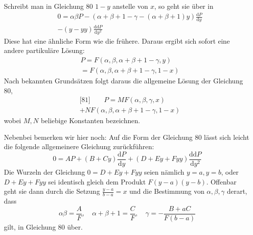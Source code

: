 Schreibt man in Gleichung 80 \(1-y\) anstelle von \(x\), so geht sie über in
\[
\begin{aligned}&0=\alpha\beta P-(\alpha+\beta+1-\gamma-(\alpha+\beta+1)y)
\frac{\mathrm{d}P}{\mathrm{d}y}\\&-(y-yy)\frac{\mathrm{dd}P}{\mathrm{d}y^2}\end{aligned}
\]
Diese hat eine ähnliche Form wie die frühere. Daraus ergibt sich sofort eine andere partikuläre Lösung:
\[
\begin{aligned}&P=F(\alpha,\beta,\alpha+\beta+1-\gamma,y)\\&=F(\alpha,\beta,\alpha+\beta+1-\gamma,1-x)\end{aligned}
\]
Nach bekannten Grundsätzen folgt daraus die allgemeine Lösung der Gleichung 80,
\[
\begin{aligned}&\text{[81]}\qquad
P=MF(\alpha,\beta,\gamma,x)\\&+NF(\alpha,\beta,\alpha+\beta+1-\gamma,1-x)\end{aligned}
\]
wobei \(M,N\) beliebige Konstanten bezeichnen.

Nebenbei bemerken wir hier noch: Auf die Form der Gleichung 80 lässt sich leicht die folgende allgemeinere Gleichung zurückführen:
\[
0=AP+(B+Cy)\frac{\mathrm{d}P}{\mathrm{d}y}
+(D+Ey+Fyy)\frac{\mathrm{dd}P}{\mathrm{d}y^2}
\]
Die Wurzeln der Gleichung \(0=D+Ey+Fyy\) seien nämlich \(y=a,y=b\), oder \(D+Ey+Fyy\) sei identisch gleich dem Produkt \(F(y-a)(y-b)\). Offenbar geht sie dann durch die Setzung \(\frac{y-a}{b-a}=x\) und die Bestimmung von \(\alpha,\beta,\gamma\) derart, dass
\[
\alpha\beta=\frac{A}{F},\quad
\alpha+\beta+1=\frac{C}{F},\quad
\gamma=-\frac{B+aC}{F(b-a)}
\]
gilt, in Gleichung 80 über.

